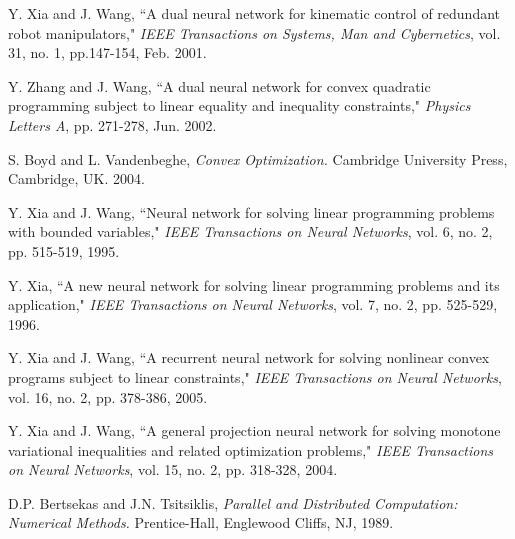 \documentclass[conference]{IEEEtran}
\begin{document}
\begin{thebibliography}{22}
 Y. Xia and J. Wang, ``A dual neural network for kinematic control of redundant robot manipulators,"
        {\it IEEE Transactions on Systems, Man and Cybernetics}, vol. 31, no. 1, pp.147-154, Feb. 2001.

 Y. Zhang and J. Wang, ``A dual neural network for convex quadratic programming subject to linear equality and inequality constraints,"
        {\it Physics Letters A}, pp. 271-278, Jun. 2002.

 S. Boyd and L. Vandenbeghe,
        {\it Convex Optimization.}
        Cambridge University Press, Cambridge, UK. 2004.

 Y. Xia and J. Wang, ``Neural network for solving linear programming problems with bounded variables,"
        {\it IEEE Transactions on Neural Networks}, vol. 6, no. 2, pp. 515-519, 1995.

 Y. Xia, ``A new neural network for solving linear programming problems and its application,"
        {\it IEEE Transactions on Neural Networks}, vol. 7, no. 2, pp. 525-529, 1996.

 Y. Xia and J. Wang, ``A recurrent neural network for solving nonlinear convex programs subject to linear constraints,"
        {\it IEEE Transactions on Neural Networks}, vol. 16, no. 2, pp. 378-386, 2005.

 Y. Xia and J. Wang, ``A general projection neural network for solving monotone variational inequalities and related optimization problems,"
        {\it IEEE Transactions on Neural Networks}, vol. 15, no. 2, pp. 318-328, 2004.



 D.P. Bertsekas and J.N. Tsitsiklis,
        {\it Parallel and Distributed Computation: Numerical Methods.}
        Prentice-Hall, Englewood Cliffs, NJ, 1989.



\end{thebibliography}

\end{document}
